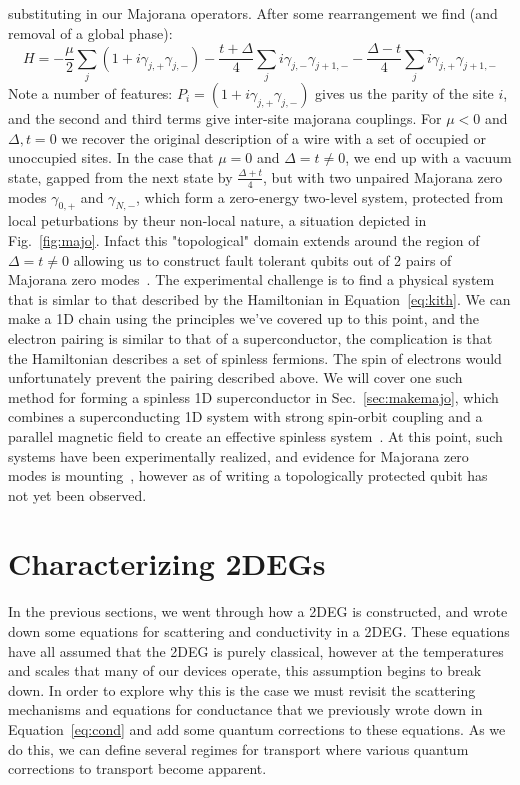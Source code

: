 substituting in our Majorana operators. After some rearrangement we find (and removal of a global phase):
\begin{equation}
  H = -\frac{\mu}{2}\sum_j(1 + i\gamma_{j,+}\gamma_{j,-}) - \frac{t + \Delta}{4}\sum_j i \gamma_{j,-}\gamma_{j+1,-} - \frac{\Delta - t}{4}\sum_j i \gamma_{j,+}\gamma_{j+1,-}
\end{equation}
Note a number of features: $P_i = (1 + i\gamma_{j,+}\gamma_{j,-})$ gives us the parity of the site $i$, and the second and third terms give inter-site majorana couplings.
For $\mu < 0$ and $\Delta, t = 0$ we recover the original description of a wire with a set of occupied or unoccupied sites. In the case
that $\mu = 0$ and $\Delta = t \neq 0$, we end up with a vacuum state, gapped from the next state by $\tfrac{\Delta+t}{4}$, but with two unpaired
Majorana zero modes $\gamma_{0,+}$ and $\gamma_{N,-}$, which form a zero-energy two-level system, protected from local peturbations
by theur non-local nature, a situation depicted in Fig.~\ref{fig:majo}. Infact this "topological" domain extends around the region of $\Delta = t \neq 0$
allowing us to construct fault tolerant qubits out of 2 pairs of Majorana zero modes~\cite{RevModPhys.80.1083}. The experimental challenge is
to find a physical system that is simlar to that described by the Hamiltonian in Equation~\ref{eq:kith}. We can make a 1D chain using the principles
we've covered up to this point, and the electron pairing is similar to that of a superconductor, the complication is that the Hamiltonian describes
a set of spinless fermions. The spin of electrons would unfortunately prevent the pairing described above. We will cover one such method for forming
a spinless 1D superconductor in Sec.~\ref{sec:makemajo}, which combines a superconducting 1D system with strong spin-orbit coupling and a
parallel magnetic field to create an effective spinless system~\cite{PhysRevLett.105.077001,PhysRevLett.105.177002}. At this point, such systems
have been experimentally realized, and evidence for Majorana zero modes is mounting~\cite{Mourik1003,s41578-018-0003-1}, however as of writing
a topologically protected qubit has not yet been observed.

\section{Characterizing 2DEGs}
\label{sec:char}
In the previous sections, we went through how a 2DEG is constructed, and wrote down some equations for scattering
and conductivity in a 2DEG. These equations have all assumed that the 2DEG is purely classical, however at the temperatures
and scales that many of our devices operate, this assumption begins to break down. In order to explore why this is the case
we must revisit the scattering mechanisms and equations for conductance that we previously wrote down in Equation~\ref{eq:cond}
and add some quantum corrections to these equations. As we do this, we can define several regimes for transport
where various quantum corrections to transport become apparent.

